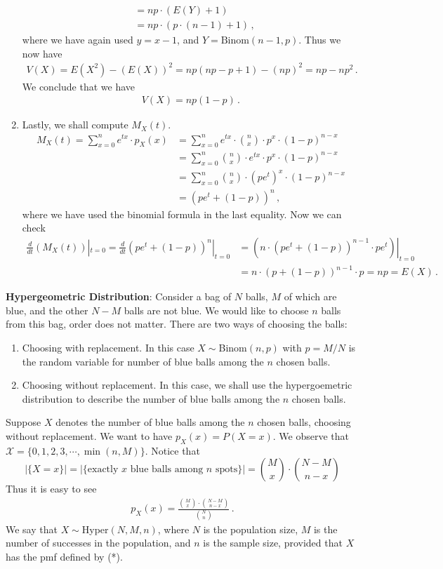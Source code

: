 \documentclass[11pt,oneside]{book}
\theoremstyle{newStyle}
\begin{document}
\begin{enumerate}
\begin{align*}
& = np \cdot (E(Y)+1) \\
&= np \cdot (p\cdot(n-1)+1)\,,
\end{align*}
where we have again used $y = x-1$, and $Y = \text{Binom}(n-1,p)$. Thus we now have
\begin{align*}
V(X) = E(X^2) - (E(X))^2 = np(np-p+1) - (np)^2 = np- np^2\,.
\end{align*}
We conclude that we have
\begin{align*}
V(X) = np(1-p)\,.
\end{align*}
\item Lastly, we shall compute $M_X(t)$. 
\begin{align*}
M_X(t) = \sum_{x=0}^n e^{tx}\cdot p_X(x) &= \sum_{x=0}^n e^{tx} \cdot \binom{n}{x} \cdot p^x \cdot (1-p)^{n-x}\\
&= \sum_{x=0}^n \binom{n}{x} \cdot e^{tx} \cdot p^x \cdot (1-p)^{n-x} \\
&= \sum_{x=0}^n \binom{n}{x}\cdot (pe^t)^x \cdot (1-p)^{n-x}\\
&= (pe^t + (1-p))^n\,,
\end{align*}
where we have used the binomial formula in the last equality. Now we can check
\begin{align*}
\frac{d}{dt}(M_X(t))|_{t=0} = \frac{d}{dt}(pe^t+(1-p))^n|_{t=0} 
&= \left(\left.n\cdot (pe^t + (1-p))^{n-1}\cdot pe^t \right)\right|_{t=0} \\
&= n\cdot (p+(1-p))^{n-1}\cdot p = np = E(X)\,.
\end{align*}
\end{enumerate}

\newpage
\textbf{Hypergeometric Distribution}: Consider a bag of $N$ balls, $M$ of which are blue, and the other $N-M$ balls are not blue.  We would like to choose $n$ balls from this bag, order does not matter. There are two ways of choosing the balls:
\begin{enumerate}
\item Choosing with replacement. In this case $X \sim$Binom$(n,p)$ with $p = M/N$ is the random variable for number of blue balls among the $n$ chosen balls.
\item  Choosing without replacement. In this case, we shall use the hypergoemetric distribution to describe the number of blue balls among the $n$ chosen balls.
\end{enumerate}
Suppose $X$ denotes the number of blue balls among the $n$ chosen balls, choosing without replacement. We want to have $p_X(x) = P(X=x)$. We observe that $\mathcal{X} = \{0,1,2,3,\cdots, \min(n,M)\}$. Notice that $$ |\{X=x\}| =| \{\text{exactly $x$ blue balls among $n$ spots}\}| = \binom{M}{x} \cdot \binom{N-M}{n-x}$$
Thus it is easy to see
\begin{align*}
p_X(x) = \frac{\binom{M}{x} \cdot \binom{N-M}{n-x}}{\binom{N}{n}}\,. \tag{*}
\end{align*}
We say that $X\sim$Hyper$(N,M,n)$, where $N$ is the population size, $M$ is the number of successes in the population, and $n$ is the sample size, provided that $X$ has the pmf defined by (*). 
\end{document}
